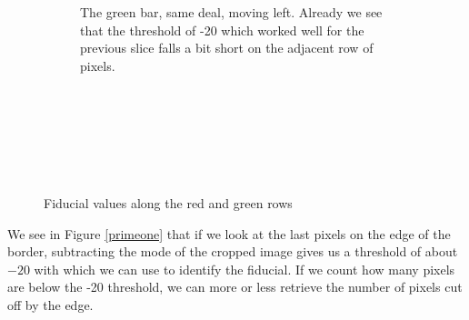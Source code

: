 \documentclass[10pt]{article}
\begin{document}
\begin{figure}[!h]
\begin{subfigure}[b]{.4\linewidth}
        \caption{The green bar, same deal, moving left. Already we see that the threshold of -20 which worked well for the previous slice falls a bit short on the adjacent row of pixels.\\ \\ \\ \\ \\ \\ \\}
    \end{subfigure}
    \caption{Fiducial values along the red and green rows}
    \label{firstone}
\end{figure}

We see in Figure \ref{primeone} that if we look at the last pixels on the edge of the border, subtracting the mode of the cropped image gives us a threshold of about $-20$ with which we can use to identify the fiducial. If we count how many pixels are below the -20 threshold, we can more or less retrieve the number of pixels cut off by the edge. 
\end{document}
